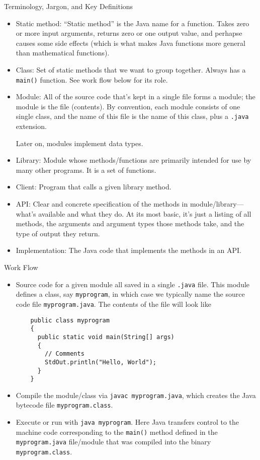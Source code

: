 \documentclass[12pt]{article}
\theoremstyle{plain}
\theoremstyle{definition}
\theoremstyle{remark}
\begin{document}
Terminology, Jargon, and Key Definitions
\begin{itemize}
  \item Static method: ``Static method'' is the Java name for a
    function. Takes zero or more input arguments, returns zero or one
    output value, and perhapse causes some side effects (which is what
    makes Java functions more general than mathematical functions).

  \item Class: Set of static methods that we want to group together.
    Always has a \texttt{main()} function. See work flow below for
    its role.

  \item Module: All of the source code that's kept in a single file
    forms a module; the module is the file (contents).
    By convention, each module consists of one single class, and the
    name of this file is the name of this class, plus a
    \texttt{.java} extension.

    Later on, modules implement data types.

  \item Library: Module whose methods/functions are primarily intended
    for use by many other programs.
    It is a set of functions.

  \item Client: Program that calls a given library method.

  \item API: Clear and concrete specification of the methods
    in module/library---what's available and what they do.
    At its most basic, it's just a listing of all methods, the
    arguments and argument types those methods take, and the type of
    output they return.

  \item Implementation: The Java code that implements the methods in
    an API.
\end{itemize}
Work Flow
\begin{itemize}
  \item Source code for a given module all saved in a single
    \texttt{.java} file.
    This module defines a class, say \texttt{myprogram}, in which
    case we typically name the source code file
    \texttt{myprogram.java}.
    The contents of the file will look like
    \lstset{style=log}
    \begin{lstlisting}
    public class myprogram
    {
      public static void main(String[] args)
      {
        // Comments
        StdOut.println("Hello, World");
      }
    }
    \end{lstlisting}
  \item Compile the module/class via \texttt{javac myprogram.java},
    which creates the Java bytecode file \texttt{myprogram.class}.
  \item Execute or run with \texttt{java myprogram}.
    Here Java transfers control to the machine code corresponding to
    the \texttt{main()} method defined in the \texttt{myprogram.java}
    file/module that was compiled into the binary
    \texttt{myprogram.class}.
\end{itemize}
\end{document}
